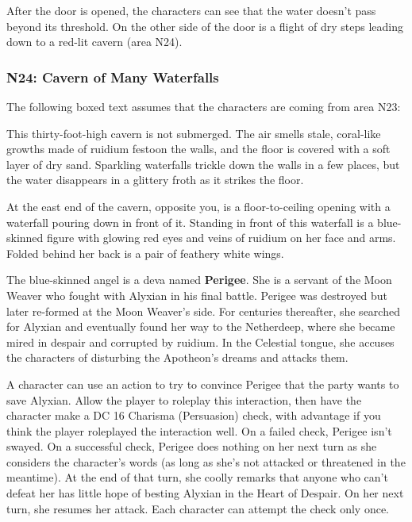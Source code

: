 \documentclass[10pt,a4paper,twoside,fancy,bg=print,twocolumn,openany,nodeprecatedcode]{dndbook}
\begin{document}
After the door is opened, the characters can see that the water doesn't pass beyond its threshold. On the other side of the door is a flight of dry steps leading down to a red-lit cavern (area N24).

\subsubsection{N24: Cavern of Many Waterfalls}
The following boxed text assumes that the characters are coming from area N23:

\begin{DndReadAloud}{}
This thirty-foot-high cavern is not submerged. The air smells stale, coral-like growths made of ruidium festoon the walls, and the floor is covered with a soft layer of dry sand. Sparkling waterfalls trickle down the walls in a few places, but the water disappears in a glittery froth as it strikes the floor.

At the east end of the cavern, opposite you, is a floor-to-ceiling opening with a waterfall pouring down in front of it. Standing in front of this waterfall is a blue-skinned figure with glowing red eyes and veins of ruidium on her face and arms. Folded behind her back is a pair of feathery white wings.

\end{DndReadAloud}

The blue-skinned angel is a deva named \textbf{Perigee}. She is a servant of the Moon Weaver who fought with Alyxian in his final battle. Perigee was destroyed but later re-formed at the Moon Weaver's side. For centuries thereafter, she searched for Alyxian and eventually found her way to the Netherdeep, where she became mired in despair and corrupted by ruidium. In the Celestial tongue, she accuses the characters of disturbing the Apotheon's dreams and attacks them.

A character can use an action to try to convince Perigee that the party wants to save Alyxian. Allow the player to roleplay this interaction, then have the character make a DC 16 Charisma (Persuasion) check, with advantage if you think the player roleplayed the interaction well. On a failed check, Perigee isn't swayed. On a successful check, Perigee does nothing on her next turn as she considers the character's words (as long as she's not attacked or threatened in the meantime). At the end of that turn, she coolly remarks that anyone who can't defeat her has little hope of besting Alyxian in the Heart of Despair. On her next turn, she resumes her attack. Each character can attempt the check only once.
\end{document}
